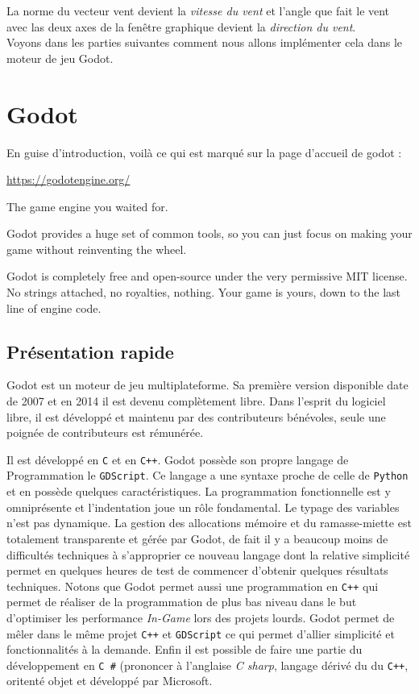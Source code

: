 \documentclass{tstextbook}
\begin{document}
La norme du vecteur vent devient la \emph{vitesse du vent} et l'angle que fait le vent avec las deux axes de la fenêtre graphique devient la \emph{direction du vent}. \\

Voyons dans les parties suivantes comment nous allons implémenter cela dans le moteur de jeu Godot.



\chapter{Godot}
\begin{summary}
En guise d'introduction, voilà ce qui est marqué sur la page d'accueil de godot : 

\begin{center}
\url{https://godotengine.org/}

\end{center}
The game engine you waited for.

Godot provides a huge set of common tools, so you can just focus on making your game without reinventing the wheel.

Godot is completely free and open-source under the very permissive MIT license. No strings attached, no royalties, nothing. Your game is yours, down to the last line of engine code. \end{summary}
\section{Présentation rapide}
Godot est un moteur de jeu multiplateforme. Sa première version disponible date de 2007 et en 2014 il est devenu complètement libre. Dans l'esprit du logiciel libre, il est développé et maintenu par des contributeurs bénévoles, seule une poignée de contributeurs est rémunérée.

Il est développé en \texttt{C} et en \texttt{C++}. Godot possède son propre langage de Programmation le \texttt{GDScript}. Ce langage a une syntaxe proche de celle de \texttt{Python} et en possède quelques caractéristiques. La programmation fonctionnelle est y omniprésente et l'indentation joue un rôle fondamental. Le typage des variables n'est pas dynamique. La gestion des allocations mémoire et du ramasse-miette est totalement transparente et gérée par Godot, de fait il y a beaucoup moins de difficultés techniques à s'approprier ce nouveau langage dont la relative simplicité permet en quelques heures de test de commencer d'obtenir quelques résultats techniques. Notons que Godot permet aussi une programmation en \texttt{C++} qui permet de réaliser de la programmation de plus bas niveau dans le but d'optimiser les performance \emph{In-Game} lors des projets lourds. Godot permet de mêler dans le même projet \texttt{C++} et \texttt{GDScript} ce qui permet d'allier simplicité et fonctionnalités à la demande. Enfin il est possible de faire une partie du développement en \texttt{C \#} (prononcer à l'anglaise \emph{C sharp}, langage dérivé du du \texttt{C++}, oritenté objet et développé par Microsoft. \\
\end{document}
